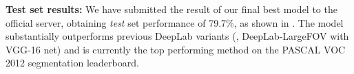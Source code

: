 \textbf{Test set results:} We have submitted the result of our final best model
to the official server, obtaining \textit{test} set performance of 79.7\%, as
shown in . The model substantially outperforms previous
DeepLab variants (\eg, DeepLab-LargeFOV with VGG-16 net) and is currently the
top performing method on the PASCAL VOC 2012 segmentation leaderboard. 


